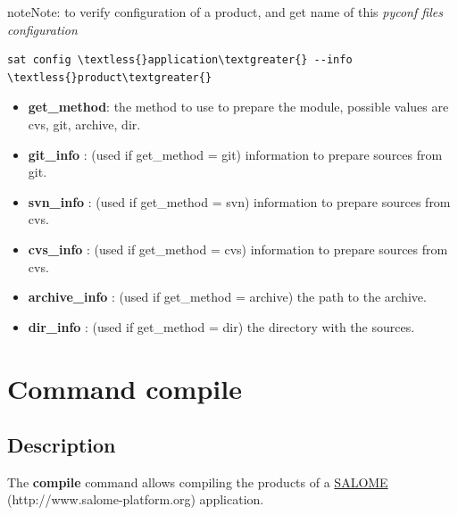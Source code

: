 \documentclass[a4paper,10pt,english]{sphinxmanual}
\begin{document}
\begin{notice}{note}{Note:}
to verify configuration of a product, and get name of this \emph{pyconf files configuration}

\begin{Verbatim}[commandchars=\\\{\}]
sat config \textless{}application\textgreater{} --info \textless{}product\textgreater{}
\end{Verbatim}
\end{notice}
\begin{itemize}
\item {} 
\textbf{get\_method}: the method to use to prepare the module, possible values are cvs, git, archive, dir.

\item {} 
\textbf{git\_info} : (used if get\_method = git) information to prepare sources from git.

\item {} 
\textbf{svn\_info} : (used if get\_method = svn) information to prepare sources from cvs.

\item {} 
\textbf{cvs\_info} : (used if get\_method = cvs) information to prepare sources from cvs.

\item {} 
\textbf{archive\_info} : (used if get\_method = archive) the path to the archive.

\item {} 
\textbf{dir\_info} : (used if get\_method = dir) the directory with the sources.

\end{itemize}


\section{Command compile}
\label{commands/compile:svn}\label{commands/compile:command-compile}\label{commands/compile::doc}

\subsection{Description}
\label{commands/compile:description}
The \textbf{compile} command allows compiling the products of a \href{http://www.salome-platform.org}{SALOME} (http://www.salome-platform.org) application.
\end{document}
